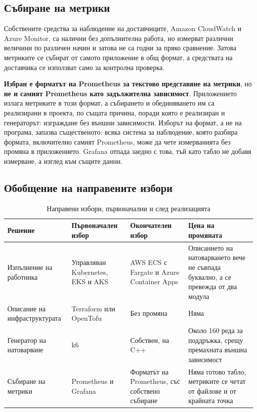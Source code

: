 
\subsection{Събиране на метрики}

Собствените средства за наблюдение на доставчиците, Amazon CloudWatch и Azure Monitor,
са налични без допълнителна работа, но измерват различни величини по различен начин и
затова не са годни за пряко сравнение. Затова метриките се събират от самото
приложение в общ формат, а средствата на доставчика се използват само за контролна
проверка.

\textbf{Избран е форматът на Prometheus за текстово представяне на метрики}, но
\textbf{не и самият Prometheus като задължителна зависимост}. Приложението излага
метриките в този формат, а събирането и обединяването им са реализирани в проекта, по
същата причина, поради която е реализиран и генераторът: изграждане без външни
зависимости. Изборът на формат, а не на програма, запазва същественото: всяка система за
наблюдение, която разбира формата, включително самият Prometheus, може да чете
измерванията без промяна в приложението. Grafana отпада заедно с това, тъй като табло не
добавя измерване, а изглед към същите данни.

\subsection{Обобщение на направените избори}

\begin{table}[H]
\caption{Направени избори, първоначални и след реализацията}
\label{tab:choices}
\centering
\begin{tabular}{@{}L{2.7cm}L{3.3cm}L{3.4cm}L{4.2cm}@{}}
\toprule
\textbf{Решение} & \textbf{Първоначален избор} & \textbf{Окончателен избор} & \textbf{Цена на промяната} \\
\midrule
Изпълнение на работника & Управляван Kubernetes, EKS и AKS &
AWS ECS с Fargate и Azure Container Apps &
Описанието на натоварването вече не съвпада буквално, а се превежда от два модула \\
\addlinespace
Описание на инфраструктурата & Terraform или OpenTofu & Без промяна & Няма \\
\addlinespace
Генератор на натоварване & k6 & Собствен, на C++ &
Около 160 реда за поддръжка, срещу премахната външна зависимост \\
\addlinespace
Събиране на метрики & Prometheus и Grafana &
Форматът на Prometheus, със собствено събиране &
Няма готово табло, метриките се четат от файлове и от крайната точка \\
\bottomrule
\end{tabular}
\end{table}

